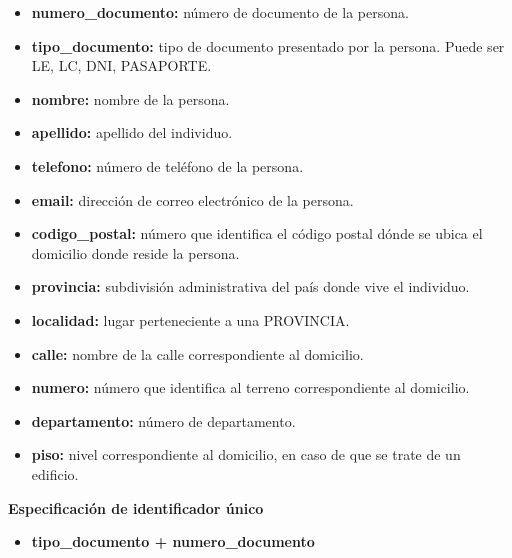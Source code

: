 \documentclass[a4paper,11pt]{article}
\begin{document}
\begin{itemize}

  \item \textbf{numero\_documento:} número de documento de la persona.

   \item \textbf{tipo\_documento:} tipo de documento presentado por la persona. Puede ser 
   LE, LC, DNI, PASAPORTE.

   \item \textbf{nombre:} nombre de la persona.

   \item \textbf{apellido:} apellido del individuo.

   \item \textbf{telefono:} número de teléfono de la persona.

   \item \textbf{email:} dirección de correo electrónico de la persona.

   \item \textbf{codigo\_postal:} número que identifica el código postal dónde se ubica el domicilio donde reside la persona.

   \item \textbf{provincia:} subdivisión administrativa del país donde vive el individuo.

   \item \textbf{localidad:} lugar perteneciente a una PROVINCIA.

   \item \textbf{calle:} nombre de la calle correspondiente al domicilio.

   \item \textbf{numero:} número que identifica al terreno correspondiente al domicilio.
   
   \item \textbf{departamento:} número de departamento.
   
   \item \textbf{piso:} nivel correspondiente al domicilio, en caso de que se trate de un edificio.

 \end{itemize}

\textbf{Especificación de identificador único}

\begin{itemize}

    \item \textbf{tipo\_documento + numero\_documento}


\end{itemize}
\end{document}
